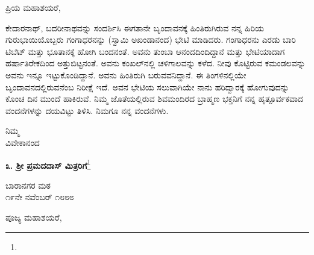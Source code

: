 \noindent
ಪ್ರಿಯ ಮಹಾಶಯರೆ,

ಕೇದಾರನಾಥ್, ಬದರೀನಾಥವನ್ನು ಸಂದರ್ಶಿಸಿ ಈಗತಾನೇ ಬೃಂದಾವನಕ್ಕೆ ಹಿಂತಿರುಗಿರುವ ನನ್ನ ಹಿರಿಯ ಗುರುಭಾಯಿಯೊಬ್ಬರು ಗಂಗಾಧರನನ್ನು (ಸ್ವಾಮಿ ಅಖಂಡಾನಂದ) ಭೇಟಿ ಮಾಡಿದರು. ಗಂಗಾಧರನು ಎರಡು ಬಾರಿ ಟಿಬೆಟ್ ಮತ್ತು ಭೂತಾನಕ್ಕೆ ಹೋಗಿ ಬಂದನಂತೆ. ಅವನು ತುಂಬಾ ಆನಂದದಿಂದಿದ್ದಾನೆ ಮತ್ತು ಭೇಟಿಯಾದಾಗ ಹರ್ಷಾತಿ\break  ರೇಕದಿಂದ ಅತ್ತುಬಿಟ್ಟನಂತೆ. ಅವನು ಕಂಖಲ್‌ನಲ್ಲಿ ಚಳಿಗಾಲವನ್ನು ಕಳೆದ. ನೀವು ಕೊಟ್ಟಿರುವ ಕಮಂಡಲವನ್ನು ಅವನು ಇನ್ನೂ ಇಟ್ಟುಕೊಂಡಿದ್ದಾನೆ. ಅವನು ಹಿಂತಿರುಗಿ ಬರುವವನಿದ್ದಾನೆ. ಈ ತಿಂಗಳಿನಲ್ಲಿಯೇ ಬೃಂದಾವನದಲ್ಲಿರುವನೆಂಬ ನಿರೀಕ್ಷೆ ಇದೆ. ಅವನ ಭೇಟಿಯ ಸಲುವಾಗಿಯೇ ನಾನು ಹರಿದ್ವಾರಕ್ಕೆ ಹೋಗುವುದನ್ನು ಕೊಂಚ ದಿನ ಮುಂದೆ ಹಾಕಿರುವೆ. ನಿಮ್ಮ ಜೊತೆಯಲ್ಲಿರುವ ಶಿವಮಂದಿರದ ಬ್ರಾಹ್ಮಣ ಭಕ್ತನಿಗೆ ನನ್ನ ಹೃತ್ಪೂರ್ವಕವಾದ ವಂದನೆಗಳನ್ನು ದಯವಿಟ್ಟು ತಿಳಿಸಿ. ನಿಮಗೂ ನನ್ನ ವಂದನೆಗಳು.

\vspace{-0.3cm}

\begin{flushright}
ನಿಮ್ಮ\\ವಿವೇಕಾನಂದ
\end{flushright}

\vspace{-0.5cm}

\begin{center}
\textbf{೩. ಶ‍್ರೀ ಪ್ರಮದದಾಸ್ ಮಿತ್ರರಿಗೆ}\footnote{}\\  {\fontsize{11pt}{11pt}\selectfont{ಶ‍್ರೀ ರಾಮಕೃಷ್ಣರಿಗೆ ಅನಂತಾನಂತ ಪ್ರಣಾಮಗಳು.}}
\end{center}

\vspace{-0.5cm}

\begin{flushright}
ಬಾರಾನಗರ ಮಠ\\೧೯ನೇ ನವೆಂಬರ್ ೧೮೮೮
\end{flushright}
\vspace{-0.5cm}

\noindent
ಪೂಜ್ಯ ಮಹಾಶಯರೆ,


